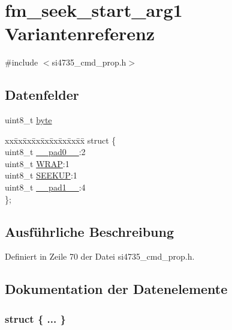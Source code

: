 \hypertarget{unionfm__seek__start__arg1}{}\section{fm\+\_\+seek\+\_\+start\+\_\+arg1 Variantenreferenz}
\label{unionfm__seek__start__arg1}


{\ttfamily \#include $<$si4735\+\_\+cmd\+\_\+prop.\+h$>$}

\subsection*{Datenfelder}
\begin{DoxyCompactItemize}
\item 
uint8\+\_\+t \hyperlink{unionfm__seek__start__arg1_a96f44d20f1dbf1c8785a7bc99a46164c}{byte}
\item 
\begin{tabbing}
xx\=xx\=xx\=xx\=xx\=xx\=xx\=xx\=xx\=\kill
struct \{\\
\>uint8\_t \hyperlink{unionfm__seek__start__arg1_a8b4eebe79ded0459acec2f4950102ba3}{\_\_pad0\_\_}:2\\
\>uint8\_t \hyperlink{unionfm__seek__start__arg1_af88f4878136175a8c7ac89aba1be647b}{WRAP}:1\\
\>uint8\_t \hyperlink{unionfm__seek__start__arg1_a54afe228e11a8c6dabf9b5361f2054d8}{SEEKUP}:1\\
\>uint8\_t \hyperlink{unionfm__seek__start__arg1_a77f12d2e278bd5c07712648ac0df5e08}{\_\_pad1\_\_}:4\\
\}; \\

\end{tabbing}\end{DoxyCompactItemize}


\subsection{Ausführliche Beschreibung}


Definiert in Zeile 70 der Datei si4735\+\_\+cmd\+\_\+prop.\+h.



\subsection{Dokumentation der Datenelemente}
\hypertarget{unionfm__seek__start__arg1_ac5d7fcbb0ae25a8d034ecd0e746b8074}{}\subsubsection[{"@7}]{\setlength{\rightskip}{0pt plus 5cm}struct \{ ... \} }\label{unionfm__seek__start__arg1_ac5d7fcbb0ae25a8d034ecd0e746b8074}
\hypertarget{unionfm__seek__start__arg1_a8b4eebe79ded0459acec2f4950102ba3}{}
